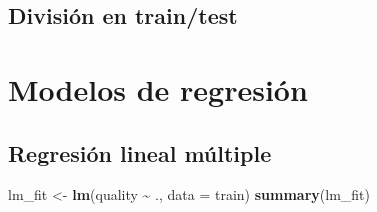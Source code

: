 \documentclass[
]{article}
\newenvironment{Shaded}{\begin{snugshade}}{\end{snugshade}}
\newcommand{\AttributeTok}[1]{\textcolor[rgb]{0.13,0.29,0.53}{#1}}
\newcommand{\DecValTok}[1]{\textcolor[rgb]{0.00,0.00,0.81}{#1}}
\newcommand{\FloatTok}[1]{\textcolor[rgb]{0.00,0.00,0.81}{#1}}
\newcommand{\FunctionTok}[1]{\textcolor[rgb]{0.13,0.29,0.53}{\textbf{#1}}}
\newcommand{\NormalTok}[1]{#1}
\newcommand{\OtherTok}[1]{\textcolor[rgb]{0.56,0.35,0.01}{#1}}
\newcommand{\SpecialCharTok}[1]{\textcolor[rgb]{0.81,0.36,0.00}{\textbf{#1}}}
\newcommand{\StringTok}[1]{\textcolor[rgb]{0.31,0.60,0.02}{#1}}
\begin{document}
\hypertarget{divisiuxf3n-en-traintest}{%
\subsection{División en train/test}\label{divisiuxf3n-en-traintest}}

\begin{Shaded}
\end{Shaded}

\hypertarget{modelos-de-regresiuxf3n}{%
\section{Modelos de regresión}\label{modelos-de-regresiuxf3n}}

\hypertarget{regresiuxf3n-lineal-muxfaltiple}{%
\subsection{Regresión lineal
múltiple}\label{regresiuxf3n-lineal-muxfaltiple}}

\begin{Shaded}
\begin{Highlighting}[]
\NormalTok{lm\_fit }\OtherTok{\textless{}{-}} \FunctionTok{lm}\NormalTok{(quality }\SpecialCharTok{\textasciitilde{}}\NormalTok{ ., }\AttributeTok{data =}\NormalTok{ train)}
\FunctionTok{summary}\NormalTok{(lm\_fit)}
\end{Highlighting}
\end{Shaded}
\end{document}
